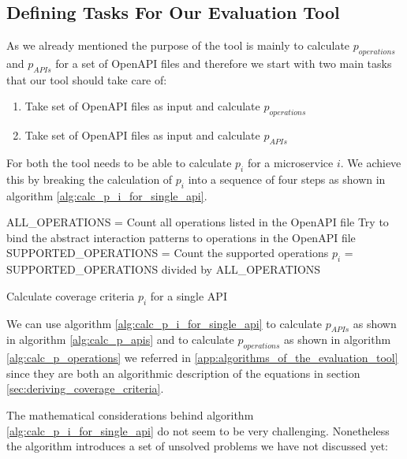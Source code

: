 \subsection{Defining Tasks For Our Evaluation Tool}
\label{sec:defining-tasks}
As we already mentioned the purpose of the tool is mainly to calculate \(p_{operations}\) and \(p_{APIs}\) for a set of OpenAPI files and therefore we start with two main tasks that our tool should take care of:
\begin{enumerate}
    \item Take set of OpenAPI files as input and calculate \(p_{operations}\) 
    \item Take set of OpenAPI files as input and calculate \(p_{APIs}\)
\end{enumerate}

For both the tool needs to be able to calculate \(p_{i}\) for a microservice \(i\). We achieve this by breaking the calculation of \(p_{i}\) into a sequence of four steps as shown in algorithm \ref{alg:calc_p_i_for_single_api}. \\

\begin{algorithm}[H]
\LinesNumbered
{}
    ALL\_OPERATIONS = Count all operations listed in the OpenAPI file\;
    Try to bind the abstract interaction patterns to operations in the OpenAPI file\;
    SUPPORTED\_OPERATIONS = Count the supported operations\;
    \(p_{i}\) = SUPPORTED\_OPERATIONS divided by ALL\_OPERATIONS 
 \caption{Calculate coverage criteria \(p_{i}\) for a single API}
 \label{alg:calc_p_i_for_single_api}
\end{algorithm}

We can use algorithm \ref{alg:calc_p_i_for_single_api} to calculate \(p_{APIs}\) as shown in algorithm \ref{alg:calc_p_apis} and to calculate \(p_{operations}\) as shown in algorithm \ref{alg:calc_p_operations} we referred in \ref{app:algorithms_of_the_evaluation_tool} since they are both an algorithmic description of the equations in section \ref{sec:deriving_coverage_criteria}.

The mathematical considerations behind algorithm \ref{alg:calc_p_i_for_single_api} do not seem to be very challenging. Nonetheless the algorithm introduces a set of unsolved problems we have not discussed yet:

